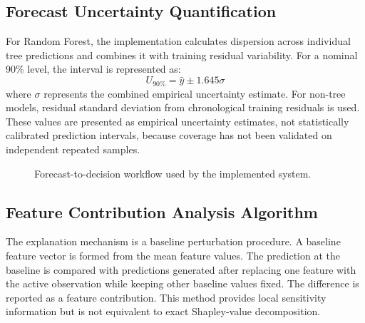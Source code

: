 \documentclass[9pt,conference]{IEEEtran}
\providecommand{\syscite}[1]{}
\begin{document}
\subsection{Forecast Uncertainty Quantification}
For Random Forest, the implementation calculates dispersion across individual tree predictions and combines it with training residual variability. \syscite{[cite: 1]} For a nominal 90\% level, the interval is represented as: \syscite{[cite: 1]}
\begin{equation}
U_{90\%} = \hat{y} \pm 1.645\sigma
\end{equation}
where $\sigma$ represents the combined empirical uncertainty estimate. \syscite{[cite: 1]} For non-tree models, residual standard deviation from chronological training residuals is used. \syscite{[cite: 1]} These values are presented as empirical uncertainty estimates, not statistically calibrated prediction intervals, because coverage has not been validated on independent repeated samples. \syscite{[cite: 1]}

\begin{figure}[htbp]
\centering
{}
\caption{Forecast-to-decision workflow used by the implemented system.}
\label{fig:workflow}
\end{figure}


\subsection{Feature Contribution Analysis Algorithm}
The explanation mechanism is a baseline perturbation procedure. \syscite{[cite: 1]} A baseline feature vector is formed from the mean feature values. \syscite{[cite: 1]} The prediction at the baseline is compared with predictions generated after replacing one feature with the active observation while keeping other baseline values fixed. \syscite{[cite: 1]} The difference is reported as a feature contribution. \syscite{[cite: 1]} This method provides local sensitivity information but is not equivalent to exact Shapley-value decomposition. \syscite{[cite: 1]}
\end{document}
